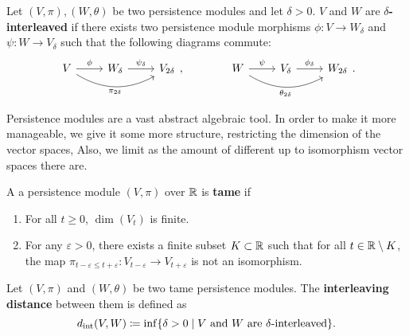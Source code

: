 \begin{definition}
    Let $ (V, \pi), (W, \theta) $ be two persistence modules and let $ \delta > 0 $. $ V $ and $ W $ are {\bf $\delta$-interleaved } if there exists two persistence module morphisms $ \phi \colon V \to W_\delta $ and $ \psi \colon W \to V_\delta $ such that the following diagrams commute:
    \begin{equation}
        \begin{array}{ccc}
        \begin{tikzcd}
            V \arrow[r, "\phi"] \arrow[rr, "\pi_{2\delta}"', bend right] & W_\delta \arrow[r, "\psi_\delta"] & V_{2\delta}
        \end{tikzcd},
        &
        \quad \quad
        &
        \begin{tikzcd}
            W \arrow[r, "\psi"] \arrow[rr, "\theta_{2\delta}"', bend right] & V_\delta \arrow[r, "\phi_\delta"] & W_{2\delta}
        \end{tikzcd}.
        \end{array}
    \end{equation}
\end{definition}

Persistence modules are a vast abstract algebraic tool. In order to make it more manageable, we give it some more structure, restricting the dimension of the vector spaces, Also, we limit as the amount of different up to isomorphism vector spaces there are.

\begin{definition}
    A a persistence module $ (V, \pi) $ over $ \mathbb R $ is {\bf tame} if
    \begin{enumerate}
        \renewcommand{\labelenumi}{(\roman{enumi})}
        \item For all $ t \geq 0 $, $ \dim(V_t) $ is finite.
        \item For any $\varepsilon > 0 $, there exists a finite subset $ K \subset \mathbb R $ such that for all $ t \in \mathbb R \setminus K $, the map $ \pi_{t-\varepsilon \leq t+\varepsilon} \colon V_{t-\varepsilon} \to V_{t+\varepsilon} $ is not an isomorphism.
    \end{enumerate}
\end{definition}

\begin{definition}
    Let $ (V, \pi) $ and $ (W, \theta) $ be two tame persistence modules. The {\bf interleaving distance} between them is defined as
    \begin{equation}
        d_{\operatorname{int}}(V, W) \coloneq \inf \{ \delta > 0 \mid V \text{ and } W \text{ are } \delta\text{-interleaved}\}.
    \end{equation}
\end{definition}

